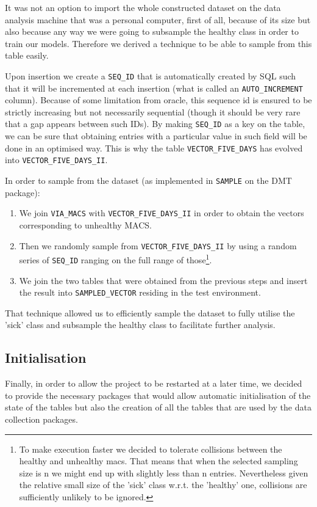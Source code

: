 It was not an option to import the whole constructed dataset on the data analysis machine that was a personal computer, first of all, because of its size but also because any way we were going to subsample the healthy class in order to train our models. Therefore we derived a technique to be able to sample from this table easily. 

Upon insertion we create a \texttt{SEQ\_ID} that is automatically created by SQL such that it will be incremented at each insertion (what is called an \texttt{AUTO\_INCREMENT} column). Because of some limitation from oracle, this sequence id is ensured to be strictly increasing but not necessarily sequential (though it should be very rare that a gap appears between such IDs). By making \texttt{SEQ\_ID} as a key on the table, we can be sure that obtaining entries with a particular value in such field will be done in an optimised way. This is why the table \texttt{VECTOR\_FIVE\_DAYS} has evolved into \texttt{VECTOR\_FIVE\_DAYS\_II}.

In order to sample from the dataset (as implemented in \texttt{SAMPLE} on the DMT package):
\begin{enumerate}
	\item We join \texttt{VIA\_MACS} with \texttt{VECTOR\_FIVE\_DAYS\_II} in order to obtain the vectors corresponding to unhealthy MACS.
	\item Then we randomly sample from \texttt{VECTOR\_FIVE\_DAYS\_II} by using a random series of \texttt{SEQ\_ID} ranging on the full range of those\footnote{To make execution faster we decided to tolerate collisions between the healthy and unhealthy macs. That means that when the selected sampling size is n we might end up with slightly less than n entries. Nevertheless given the relative small size of the 'sick' class w.r.t. the 'healthy' one, collisions are sufficiently unlikely to be ignored.}. 
	\item We join the two tables that were obtained from the previous steps and insert the result into \texttt{SAMPLED\_VECTOR} residing in the test environment. 
\end{enumerate}

That technique allowed us to efficiently sample the dataset to fully utilise the 'sick' class and subsample the healthy class to facilitate further analysis.

\subsection{Initialisation}
Finally, in order to allow the project to be restarted at a later time, we decided to provide the necessary packages that would allow automatic initialisation of the state of the tables but also the creation of all the tables that are used by the data collection packages. 


